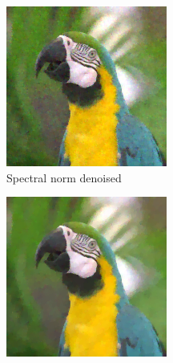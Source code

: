 \documentclass{article}
\begin{document}
\begin{figure}[ht]
    \begin{subfigure}[b]{0.24\textwidth}
        \centering
        \includegraphics[width=\textwidth]{../images/SpectralNormdenoised_colour.png}
        \caption{Spectral norm denoised}
        \label{fig:SpectralNormdenoised_colour}
    \end{subfigure}
    \begin{subfigure}[b]{0.24\textwidth}
        \centering
        \includegraphics[width=\textwidth]{../images/FrobeniusNormdenoised_colour.png}

\end{subfigure}
\end{figure}
\end{document}
